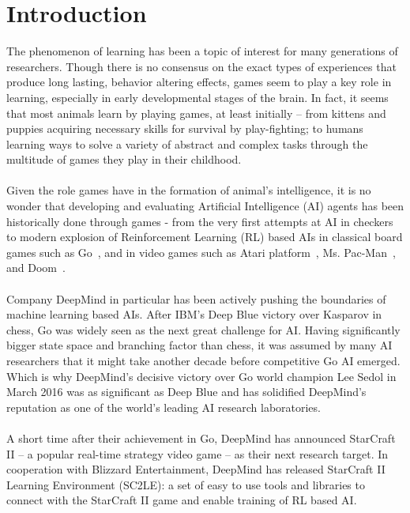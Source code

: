 \chapter*{Introduction}

The phenomenon of learning has been a topic of interest for many generations of researchers. Though there is no consensus on the exact types of experiences that produce long lasting, behavior altering effects, games seem to play a key role in learning, especially in early developmental stages of the brain. In fact, it seems that most animals learn by playing games, at least initially -- from kittens and puppies acquiring necessary skills for survival by play-fighting; to humans learning ways to solve a variety of abstract and complex tasks through the multitude of games they play in their childhood. 
\\\\
Given the role games have in the formation of animal’s intelligence, it is no wonder that developing and evaluating Artificial Intelligence (AI) agents has been historically done through games - from the very first attempts at AI in checkers~\cite{Samuel1959} to modern explosion of Reinforcement Learning (RL) based AIs in classical board games such as Go~\cite{Silver2016}, and in video games such as Atari platform~\cite{Mnih2015}, Ms. Pac-Man~\cite{Seijen2017}, and Doom~\cite{Kempka2016}. 
\\\\
Company DeepMind in particular has been actively pushing the boundaries of machine learning based AIs. After IBM’s Deep Blue victory over Kasparov in chess, Go was widely seen as the next great challenge for AI. Having significantly bigger state space and branching factor than chess, it was assumed by many AI researchers that it might take another decade before competitive Go AI emerged. Which is why DeepMind’s decisive victory over Go world champion Lee Sedol in March 2016 was as significant as Deep Blue and has solidified DeepMind’s reputation as one of the world's leading AI research laboratories.
\\\\
A short time after their achievement in Go, DeepMind has announced StarCraft II -- a popular real-time strategy video game -- as their next research target. In cooperation with Blizzard Entertainment, DeepMind has released StarCraft II Learning Environment (SC2LE): a set of easy to use tools and libraries to connect with the StarCraft II game and enable training of RL based AI. 
